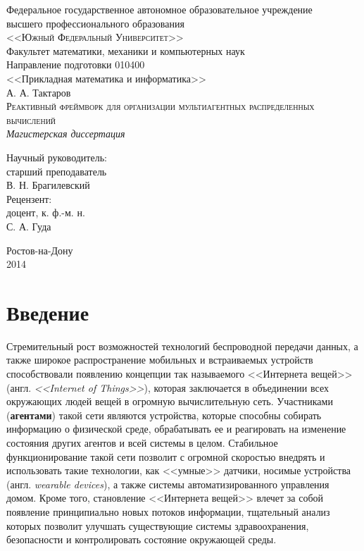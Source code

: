 \documentclass[a4paper,14pt,href,draft]{article}
\begin{document}
\thispagestyle{empty}
\begin{center}
Федеральное государственное автономное образовательное учреждение \\
высшего профессионального образования \\
\textsc{<<Южный Федеральный Университет>>}\\[1.0cm]

Факультет математики, механики и компьютерных наук\\[1.0cm]

Направление подготовки 010400 \\
<<Прикладная математика и информатика>>\\[3cm]

А. А. Тактаров \\[1.0cm]
\textsc{Реактивный фреймворк для организации мультиагентных распределенных вычислений}\\[1.0cm]

\textit{Магистерская диссертация}\\[2.0cm]

\begin{flushright}
    Научный руководитель: \\
    старший преподаватель \\
    В. Н. Брагилевский \\[1.0cm]

    Рецензент: \\
    доцент, к. ф.-м. н.\\
    С. А. Гуда
\end{flushright}

\vfill

  Ростов-на-Дону\\
  2014
\end{center}

\newpage
\tableofcontents

\newpage
\section*{Введение}

Стремительный рост возможностей технологий беспроводной передачи данных, а также широкое распространение мобильных и
встраиваемых устройств способствовали появлению концепции так называемого <<Интернета вещей>>
(англ. \textit{<<Internet of Things>>})\cite{IoTWired}, которая заключается в объединении всех окружающих людей вещей в
огромную вычислительную сеть. Участниками (\textbf{агентами}) такой сети являются устройства, которые способны собирать
информацию о физической среде, обрабатывать ее и реагировать на изменение состояния других агентов и всей системы в целом.
Стабильное функционирование такой сети позволит с огромной скоростью внедрять и использовать такие технологии, как
<<умные>> датчики\cite{NestThermostat}, носимые устройства (англ. \textit{wearable devices}), а также системы
автоматизированного управления домом. Кроме того, становление <<Интернета вещей>> влечет за собой появление
принципиально новых потоков информации, тщательный анализ которых позволит улучшать существующие системы
здравоохранения, безопасности и контролировать состояние окружающей среды.
\end{document}
